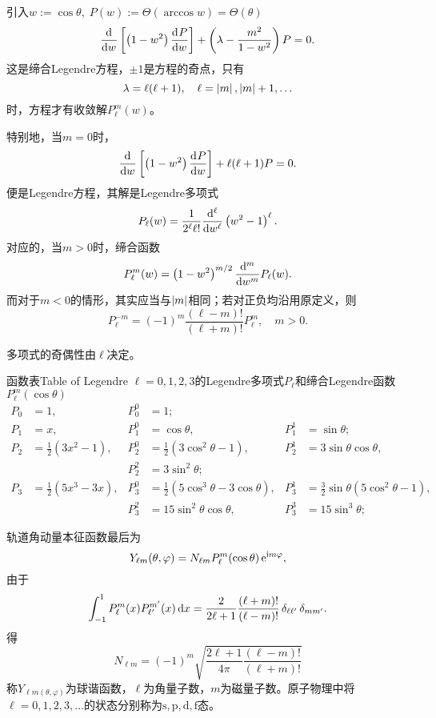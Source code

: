 引入$w:=\cos\theta,\;P(w):=\varTheta(\arccos w)=\varTheta(\theta)$
\begin{equation}
	\dd w\fkh{\kh{1-w^2}\dv Pw}+\kh{\lambda-\frac{m^2}{1-w^2}}P=0.
\end{equation}
这是缔合Legendre方程，$\pm 1$是方程的奇点，只有
\[
	\lambda=\ell(\ell+1),\quad\ell=\abs m,\abs m+1,\ldots
\]
时，方程才有收敛解$P_\ell^m(w)$。

特别地，当$m=0$时，
\[
	\dd w\fkh{\kh{1-w^2}\dv Pw}+\ell(\ell+1)P=0.
\]
便是Legendre方程，其解是Legendre多项式
\[
P_\ell(w)=\frac1{2^\ell\ell!}\dd[\ell]w\kh{w^2-1}^\ell.
\]
对应的，当$m>0$时，缔合\Legd 函数
\[
P_\ell^m(w)=\kh{1-w^2}^{m/2}\dd[m]wP_\ell(w).
\]
而对于$m<0$的情形，其实应当与$\abs m$相同；若对正负均沿用原定义，则
\[
P_\ell^{-m}=(-1)^m\frac{(\ell-m)!}{(\ell+m)!}P_\ell^m,\quad m>0.
\]

\Legd 多项式的奇偶性由$\ell$决定。
\begin{example}{\Legd 函数表}{Table of Legendre}
	$\ell=0,1,2,3$的Legendre多项式$P_\ell$和缔合Legendre函数$P_\ell^m(\cos\theta)$%
	\begin{align*}
		P_0 & =1, & P_0^0 & =1;\\
		P_1 & =x, & P_1^0 & =\cos\theta, & P_1^1 & =\sin\theta;\\
		P_2 & =\frac12(3x^2-1), & P_2^0 & =\frac12(3\cos^2\theta-1), & P_2^1 & =3\sin\theta\cos\theta,\\
			&& P_2^2 &=3\sin^2\theta;\\
		P_3 & =\frac12(5x^3-3x), & P_3^0 & =\frac12(5\cos^3\theta-3\cos\theta), & P_3^1 & =\frac32\sin\theta(5\cos^2\theta-1),\\
			&& P_3^2 & =15\sin^2\theta\cos\theta, & P_3^3 & =15\sin^3\theta;
	\end{align*}
\end{example}
轨道角动量本征函数最后为
\[
	Y_{\ell m}(\theta,\varphi)=N_{\ell m}P_\ell^m(\cos\theta)\e{\i m\varphi},
\]
由于
\[
	\int_{-1}^1P_\ell^m(x)P_{\ell'}^{m'}(x)\d x=\frac2{2\ell+1}\frac{(\ell+m)!}{(\ell-m)!}\vd_{\ell\ell'}\vd_{mm'}.
\]
得
\[
N_{\ell m}=(-1)^m\sqrt{\frac{2\ell+1}{4\pi}\frac{(\ell-m)!}{(\ell+m)!}}
\]
称$Y_{\ell m(\theta,\varphi)}$为球谐函数，$\ell$为角量子数，$m$为磁量子数。原子物理中将$\ell=0,1,2,3,\ldots$的状态分别称为$\mathrm{s,p,d,f}$态。

